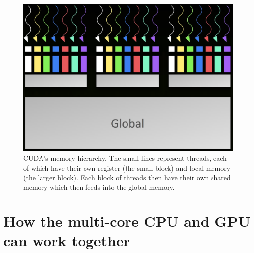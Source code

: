 \documentclass[a4paper,11pt]{article}
\begin{document}
\begin{figure}[ht]
  \centering
  \includegraphics[scale=0.3]{img/cuda-mem}
  \caption{CUDA's memory hierarchy. The small lines represent threads, each of which have their own register (the small
  block) and local memory (the larger block). Each block of threads then have their own shared memory which then feeds
  into the global memory.~\cite{slides:KhronosOpenCLOverview}}
\label{fig:cuda-mem}
\end{figure}





\section{How the multi-core CPU and GPU can work together} %
\label{sec:parallelism_in_the_multi_core_cpu_and_gpu}
\end{document}
